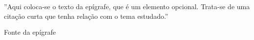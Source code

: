 %
%
\thispagestyle{empty}
\begin{epigrafe}
\begin{em}

''Aqui coloca-se o texto da epígrafe, que é um elemento opcional. Trata-se de uma citação curta que tenha relação com o tema estudado.''
\newline
\newline
\end{em}
\begin{autorepigrafe}
Fonte da epígrafe
\end{autorepigrafe}

\end{epigrafe}


